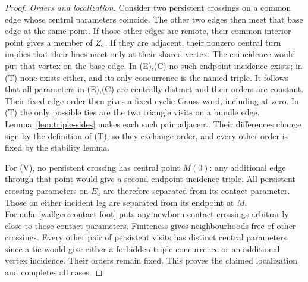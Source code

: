 \begin{proof}
\emph{Orders and localization.}
Consider two persistent crossings on a common edge whose central parameters
coincide. The other two edges then meet that base edge at the same point.
If those other edges are remote, their common interior point gives a member
of $Z_{\rm c}$. If they are adjacent, their nonzero central turn implies that
their lines meet only at their shared vertex. The coincidence would put that
vertex on the base edge. In (E),(C) no such endpoint incidence exists; in
(T) none exists either, and its only concurrence is the named triple.
It follows that all parameters in (E),(C) are centrally distinct and their
orders are constant. Their fixed edge order then gives a fixed cyclic Gauss
word, including at zero. In (T) the only possible ties are the two triangle
visits on a bundle edge. Lemma~\ref{lem:triple-sides} makes each such pair
adjacent. Their differences change sign by the definition of (T), so they
exchange order, and every other order is fixed by the stability lemma.

For (V), no persistent crossing has central point $M(0)$: any additional
edge through that point would give a second endpoint-incidence triple.
All persistent crossing parameters on $E_a$ are therefore separated from its
contact parameter. Those on either incident leg are separated from its
endpoint at $M$. Formula~\eqref{wallgeo:contact-foot} puts any newborn contact
crossings arbitrarily close to those contact parameters. Finiteness gives
neighbourhoods free of other crossings. Every other pair of persistent visits
has distinct central parameters, since a tie would give either a forbidden
triple concurrence or an additional vertex incidence. Their orders remain
fixed. This proves the claimed localization and completes all cases.
\end{proof}



